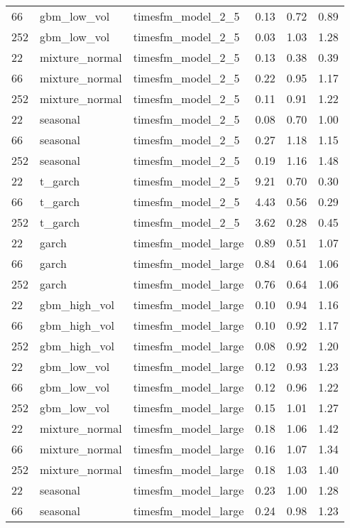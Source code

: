{\begin{tabular}{lllrrr}
66 & gbm\_low\_vol & timesfm\_model\_2\_5 & 0.13 & 0.72 & 0.89 \\
252 & gbm\_low\_vol & timesfm\_model\_2\_5 & 0.03 & 1.03 & 1.28 \\
\midrule
22 & mixture\_normal & timesfm\_model\_2\_5 & 0.13 & 0.38 & 0.39 \\
66 & mixture\_normal & timesfm\_model\_2\_5 & 0.22 & 0.95 & 1.17 \\
252 & mixture\_normal & timesfm\_model\_2\_5 & 0.11 & 0.91 & 1.22 \\
\midrule
22 & seasonal & timesfm\_model\_2\_5 & 0.08 & 0.70 & 1.00 \\
66 & seasonal & timesfm\_model\_2\_5 & 0.27 & 1.18 & 1.15 \\
252 & seasonal & timesfm\_model\_2\_5 & 0.19 & 1.16 & 1.48 \\
\midrule
22 & t\_garch & timesfm\_model\_2\_5 & 9.21 & 0.70 & 0.30 \\
66 & t\_garch & timesfm\_model\_2\_5 & 4.43 & 0.56 & 0.29 \\
252 & t\_garch & timesfm\_model\_2\_5 & 3.62 & 0.28 & 0.45 \\
\midrule
22 & garch & timesfm\_model\_large & 0.89 & 0.51 & 1.07 \\
66 & garch & timesfm\_model\_large & 0.84 & 0.64 & 1.06 \\
252 & garch & timesfm\_model\_large & 0.76 & 0.64 & 1.06 \\
\midrule
22 & gbm\_high\_vol & timesfm\_model\_large & 0.10 & 0.94 & 1.16 \\
66 & gbm\_high\_vol & timesfm\_model\_large & 0.10 & 0.92 & 1.17 \\
252 & gbm\_high\_vol & timesfm\_model\_large & 0.08 & 0.92 & 1.20 \\
\midrule
22 & gbm\_low\_vol & timesfm\_model\_large & 0.12 & 0.93 & 1.23 \\
66 & gbm\_low\_vol & timesfm\_model\_large & 0.12 & 0.96 & 1.22 \\
252 & gbm\_low\_vol & timesfm\_model\_large & 0.15 & 1.01 & 1.27 \\
\midrule
22 & mixture\_normal & timesfm\_model\_large & 0.18 & 1.06 & 1.42 \\
66 & mixture\_normal & timesfm\_model\_large & 0.16 & 1.07 & 1.34 \\
252 & mixture\_normal & timesfm\_model\_large & 0.18 & 1.03 & 1.40 \\
\midrule
22 & seasonal & timesfm\_model\_large & 0.23 & 1.00 & 1.28 \\
66 & seasonal & timesfm\_model\_large & 0.24 & 0.98 & 1.23 \\

\end{tabular}}
